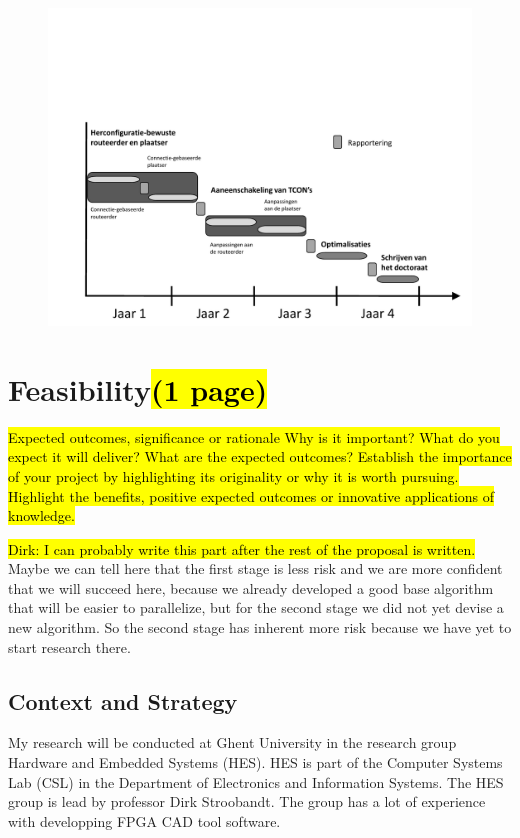 \documentclass[a4paper,oneside,12pt]{article}
\begin{document}
\begin{figure}[ht]
\centering
\includegraphics[width = \textwidth,trim = 0mm 0mm 0mm 70mm, clip]{tijdschema.pdf}
\end{figure}

\newpage
\section{Feasibility\hl{(1 page)}}
\hl{Expected outcomes, significance or rationale
Why is it important? 
What do you expect it will deliver? 
What are the expected outcomes? 
Establish the importance of your project by highlighting its originality or why it is worth pursuing. Highlight the benefits, positive expected outcomes or innovative applications of knowledge.}

\hl{Dirk: I can probably write this part after the rest of the proposal is written.}
Maybe we can tell here that the first stage is less risk and we are more confident that we will succeed here, because we already developed a good base algorithm that will be easier to parallelize, but for the second stage we did not yet devise a new algorithm. So the second stage has inherent more risk because we have yet to start research there.


\subsection{Context and Strategy}\label{context}
My research will be conducted at Ghent University in the research group Hardware and Embedded Systems (HES). HES is part of the Computer Systems Lab (CSL) in the Department of Electronics and Information Systems. The HES group is lead by professor Dirk Stroobandt. The group has a lot of experience with developping FPGA CAD tool software.
\end{document}
